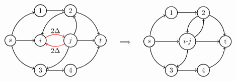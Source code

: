 \[\begin{tabular}{ccc}
    \begin{tikzpicture}[node distance={15mm}, thick , main/.style = {draw, circle}] 
    

    \node[main] (0) {$s$};
    \node[main] (3) [right of= 0 ] {$i$};
    \node[main] (4) [right of=3] {$j$};
    \node[main] (1) [below of = 3 ] {3};
    \node[main] (2) [above of = 3] {$1$};
    
    \node[main] (6) [above of=4] {$2$};
    \node[main] (5) [below of=4] {$4$};
    \node[main] (7) [right of=4] {$t$};
    \draw[->] (0) [bend right] to (1);
    \draw[->] (0) [bend left] to (2);
    \draw[->] (0) to (3);
    \draw[->] (3) [red, bend left] to (4);
    \node at (2.25,0.5) {$2\Delta$};
    \node at (2.25,-0.5) {$2\Delta$};
    \draw[->] (4) [red, bend left] to (3);
    
    \draw[->] (2) to (6);
    \draw[->] (4)[bend left] to (1);
    \draw[->] (4)[bend right] to (6);
    \draw[->] (6)[bend right] to (3);
    \draw[->] (4) to (7);
    \draw[->] (1) to (5);
    \draw[->] (6)[bend left] to (7);
    \draw[->] (5)[bend right] to (7);


\end{tikzpicture}&\begin{tikzpicture}
    \node {$\implies$};%
    \node at (0,1.4) {};
    \node at (0,-1.6) {};
\end{tikzpicture}  &
\begin{tikzpicture}[node distance={19mm}, thick , main/.style = {draw, circle}] 
    
    
    \node[main] (m)  {$i$-$j$};
    \node[main] (0) [left of = m ]{$s$};
    \node[main] (1) at (-0.8,1.45) {1};
    
    \node[main] (2) at (0.8,1.45) {$2$};

    \node[main] (3) at (-0.8,-1.45) {$3$};
    \node[main] (4) at (0.8,-1.45) {$4$};

    \node[main] (5) [right of = m] {t};

    
    \draw[->] (0) to (m);
    \draw[->] (0)[bend left] to (1);
    \draw[->] (0)[bend right] to (3);

    \draw[->] (1) to (2);

    \draw[->] (2)[bend right] to (m);
    \draw[->] (m)[bend right] to (2);
    \draw[->] (m)[bend left] to (3);
    \draw[->] (2)[bend left] to (5);
    \draw[->] (m) to (5);
    \draw[->] (3) to (4);  
    \draw[->] (4)[bend right] to (5);

\end{tikzpicture}
\end{tabular}\]

